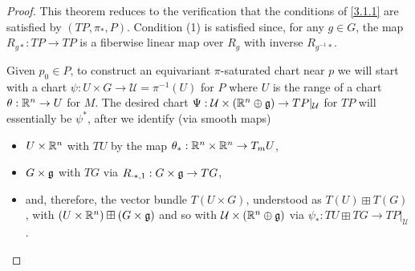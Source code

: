 \begin{proof}
This theorem reduces to the verification that the conditions of \ref{3.1.1} are satisfied by $(TP, \pi_*, P)$. Condition (1) is satisfied since, for any $g \in G$, the map $R_{g*}:TP \to TP$ is a fiberwise linear map over $R_g$ with inverse $R_{g^{-1} *}$.

Given $p_0 \in P$, to construct an equivariant $\pi$-saturated chart near $p$ we will start with a chart $\psi:U \times G \to \mathcal U = \pi^{-1}(U)$ for $P$ where $U$ is the range of a chart $\theta:\mathbb{R}^n \to U$ for $M$. The desired chart $\Psi: \mathcal U \times (\mathbb{R}^n \oplus \mathfrak{g}) \to TP|_{\mathcal U}$ for $TP$ will essentially be $\psi^*$, after we identify (via smooth maps) 
    \begin{itemize}
    
    \item $U \times \mathbb{R}^n$ with $TU$ by the map $\theta_{*}: \mathbb{R}^n \times \mathbb{R}^n \to T_m U$,  
    
    \item $G \times \mathfrak{g}$ with $TG$ via $R_{\cdot *, 1}: G \times \mathfrak{g} \to T G$,
    
    \item and, therefore, the vector bundle $T(U \times G)$, understood as $T(U) \boxplus T(G)$, with $(U \times \mathbb{R}^n) \boxplus (G \times \mathfrak{g})$ and so with $\mathcal U \times (\mathbb{R}^n \oplus \mathfrak{g})$ via $\psi_*: TU \boxplus TG \to TP|_{\mathcal U}$.
    
    \end{itemize}


\end{proof}

